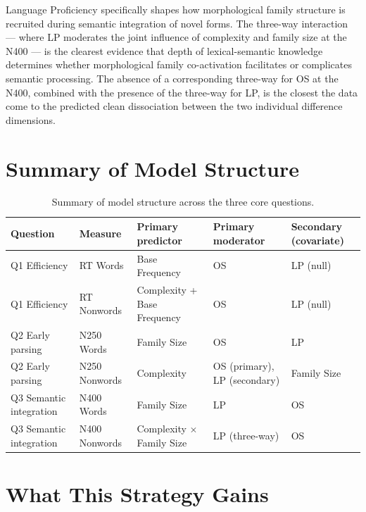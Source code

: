 \documentclass[12pt]{article}
\begin{document}
	Language Proficiency specifically shapes how morphological family structure is recruited during semantic integration of novel forms. The three-way interaction --- where LP moderates the joint influence of complexity and family size at the N400 --- is the clearest evidence that depth of lexical-semantic knowledge determines whether morphological family co-activation facilitates or complicates semantic processing. The absence of a corresponding three-way for OS at the N400, combined with the presence of the three-way for LP, is the closest the data come to the predicted clean dissociation between the two individual difference dimensions.
	
	\section{Summary of Model Structure}
	
	\begin{table}[h!]
		\tiny
		\centering
		\renewcommand{\arraystretch}{1.4}
		\begin{tabular}{p{2cm} p{2.2cm} p{3cm} p{2.8cm} p{3cm}}
			\toprule
			\textbf{Question} & \textbf{Measure} & \textbf{Primary predictor} & \textbf{Primary moderator} & \textbf{Secondary (covariate)} \\
			\midrule
			Q1 Efficiency & RT Words       & Base Frequency              & OS                          & LP (null) \\
			Q1 Efficiency & RT Nonwords    & Complexity + Base Frequency & OS                          & LP (null) \\
			Q2 Early parsing & N250 Words  & Family Size                 & OS                          & LP \\
			Q2 Early parsing & N250 Nonwords & Complexity                & OS (primary), LP (secondary) & Family Size \\
			Q3 Semantic integration & N400 Words & Family Size            & LP                          & OS \\
			Q3 Semantic integration & N400 Nonwords & Complexity $\times$ Family Size & LP (three-way)   & OS \\
			\bottomrule
		\end{tabular}
		\caption{Summary of model structure across the three core questions.}
	\end{table}
	
	\section{What This Strategy Gains}
	
\end{document}
